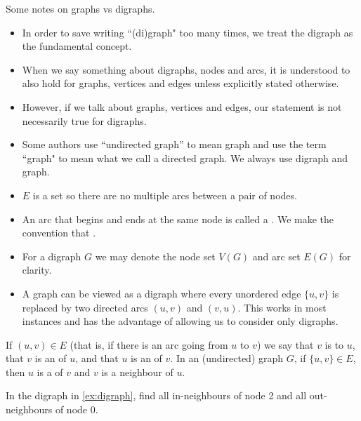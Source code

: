 Some notes on graphs vs digraphs.
\begin{itemize}
  \item In order to save writing ``(di)graph" too many times, we treat the digraph as the fundamental concept.
  \item When we say something about digraphs, nodes and arcs, it is understood to also hold for graphs, 
  vertices and edges unless explicitly stated otherwise. 
  \item However, if we talk about graphs, vertices and edges, our statement is not necessarily true for digraphs. 
  \item Some authors use ``undirected graph'' to mean graph and use the term ``graph" to mean what we call a directed graph. 
  We always use digraph and graph.
  \item $E$ is a set so there are no multiple arcs between a pair of nodes.
  \item An arc that begins and ends at the same node is called a . 
  We make the convention that . 
  \item For a digraph $G$ we may denote the node set $V(G)$ and arc set $E(G)$ for clarity.
  \item A graph can be viewed as a digraph where every unordered edge $\{u, v\}$ 
  is replaced by two directed arcs $(u, v)$ and $(v, u)$.  
  This works in most instances and has the advantage of allowing us to consider only digraphs.
\end{itemize}

\begin{Definition}\label{def:adjacent}  
If $(u, v)\in E$ (that is, if there is an arc going from $u$ to $v$) we say that $v$ is  
to $u$, that $v$ is an  of $u$, and that $u$ is an  of $v$.
In an (undirected) graph $G$, if $\{u, v\} \in E$, then $u$ is a  of $v$ and $v$ is a neighbour of $u$. 
\end{Definition}

\begin{Boxample}[2]
In the digraph in \cref{ex:digraph}, find all in-neighbours of node 2 and all out-neighbours of node 0.
\end{Boxample}

